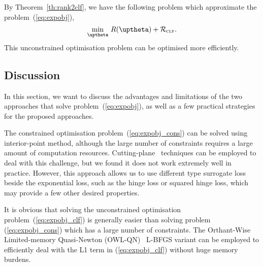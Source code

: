 By Theorem~\ref{th:rank2clf}, we have the following problem
which approximate the problem~(\ref{eq:expobj}),
\begin{equation}
\label{eq:expobj_clf}
\min_{\uptheta} \, R(\uptheta) + \RCal_\textsc{clf}.
\end{equation}
This unconstrained optimisation problem can be optimised more efficiently.



\subsection{Discussion}

In this section, we want to discuss the advantages and limitations of the 
two approaches that solve problem~(\ref{eq:expobj}), 
as well as a few practical strategies for the proposed approaches.

The constrained optimisation problem~(\ref{eq:expobj_cons}) can be solved using interior-point method,
although the large number of constraints requires a large amount of computation resources.
Cutting-plane~\cite{avriel2003nonlinear} techniques can be employed to deal with this challenge, 
but we found it does not work extremely well in practice.
However, this approach allows us to use different type surrogate loss beside the exponential loss,
such as the hinge loss or squared hinge loss, which may provide a few other desired properties. %

It is obvious that solving the unconstrained optimisation problem~(\ref{eq:expobj_clf})
is generally easier than solving problem (\ref{eq:expobj_cons}) which has a large number of constraints.
The Orthant-Wise Limited-memory Quasi-Newton (OWL-QN)~\cite{andrew2007scalable} L-BFGS variant can be employed to
efficiently deal with the L1 term in (\ref{eq:expobj_clf}) without huge memory burdens.
